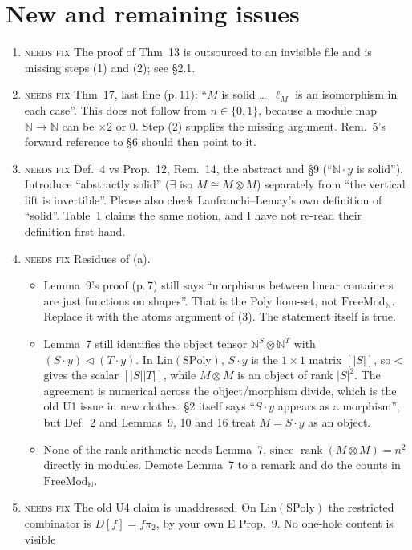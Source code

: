 \documentclass[11pt]{article}
\newcommand{\tri}{\mathbin{\triangleleft}}
\newcommand{\N}{\mathbb{N}}
\newcommand{\iss}[1]{\textsc{#1}}
\begin{document}
\section{New and remaining issues}
\begin{enumerate}[label=\textbf{N\arabic*.},leftmargin=*]
\item \iss{needs fix} The proof of Thm~13 is outsourced to an invisible file and is missing steps
(1) and (2); see \S2.1.
\item \iss{needs fix} Thm~17, last line (p.\,11): ``$M$ is solid \dots\ $\ell_M$ is an isomorphism
in each case''. This does not follow from $n\in\{0,1\}$, because a module map $\N\to\N$ can be
$\times2$ or $0$. Step (2) supplies the missing argument. Rem.~5's forward reference to \S6
should then point to it.
\item \iss{needs fix} Def.~4 vs Prop.~12, Rem.~14, the abstract and \S9 (``$\N\cdot y$ is
solid''). Introduce ``abstractly solid'' ($\exists$ iso $M\cong M\otimes M$) separately from
``the vertical lift is invertible''. Please also check Lanfranchi--Lemay's own definition of
``solid''. Table~1 claims the same notion, and I have not re-read their definition first-hand.
\item \iss{needs fix} Residues of (a).
\begin{itemize}[leftmargin=1.2em]
\item Lemma~9's proof (p.\,7) still says ``morphisms between linear containers are just functions
on shapes''. That is the Poly hom-set, not $\mathrm{FreeMod}_\N$. Replace it with the atoms argument
of (3). The statement itself is true.
\item Lemma~7 still identifies the object tensor $\N^S\otimes\N^T$ with $(S\cdot y)\tri(T\cdot y)$.
In $\mathrm{Lin}(\mathrm{SPoly})$, $S\cdot y$ is the $1\times1$ matrix $[|S|]$, so $\tri$ gives the
scalar $[|S||T|]$, while $M\otimes M$ is an object of rank $|S|^2$. The agreement is numerical
across the object/morphism divide, which is the old U1 issue in new clothes. \S2 itself says
``$S\cdot y$ appears as a morphism'', but Def.~2 and Lemmas~9, 10 and 16 treat $M=S\cdot y$ as an
object.
\item None of the rank arithmetic needs Lemma~7, since $\operatorname{rank}(M\otimes M)=n^2$
directly in modules. Demote Lemma~7 to a remark and do the counts in $\mathrm{FreeMod}_\N$.
\end{itemize}
\item \iss{needs fix} The old U4 claim is unaddressed. On $\mathrm{Lin}(\mathrm{SPoly})$ the
restricted combinator is $D[f]=f\pi_2$, by your own E Prop.~9. No one-hole content is visible

\end{enumerate}
\end{document}
